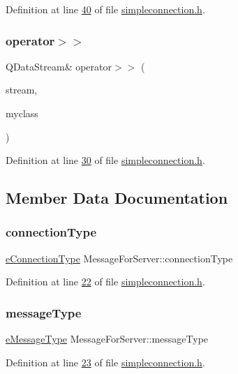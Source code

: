 Definition at line \hyperlink{a00008_source_l00040}{40} of file \hyperlink{a00008_source}{simpleconnection.\+h}.

\mbox{\label{a00121_a80c0e129812710b29e5cabd9e412387b}} 
\subsubsection{\texorpdfstring{operator$>$$>$}{operator>>}}
{\footnotesize\ttfamily Q\+Data\+Stream\& operator$>$$>$ (\begin{DoxyParamCaption}\item[{Q\+Data\+Stream \&}]{stream,  }\item[{\hyperlink{a00121}{Message\+For\+Server} \&}]{myclass }\end{DoxyParamCaption})\hspace{0.3cm}{\ttfamily [friend]}}



Definition at line \hyperlink{a00008_source_l00030}{30} of file \hyperlink{a00008_source}{simpleconnection.\+h}.



\subsection{Member Data Documentation}
\mbox{\label{a00121_a32f7c4034883ac363ca247c8a2843040}} 
\subsubsection{\texorpdfstring{connection\+Type}{connectionType}}
{\footnotesize\ttfamily \hyperlink{a00008_ab66d8802c50493de7d50e181d6f8e296}{e\+Connection\+Type} Message\+For\+Server\+::connection\+Type}



Definition at line \hyperlink{a00008_source_l00022}{22} of file \hyperlink{a00008_source}{simpleconnection.\+h}.

\mbox{\label{a00121_a77e3d9ee30093b40db7f2d8f5d7590aa}} 
\subsubsection{\texorpdfstring{message\+Type}{messageType}}
{\footnotesize\ttfamily \hyperlink{a00008_a700ed30d49bfe436323e17539d3a0010}{e\+Message\+Type} Message\+For\+Server\+::message\+Type}



Definition at line \hyperlink{a00008_source_l00023}{23} of file \hyperlink{a00008_source}{simpleconnection.\+h}.


